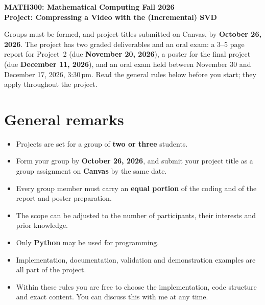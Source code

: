 \documentclass[11pt,a4paper]{article}
\begin{document}
\begin{center}
  {\large\bfseries MATH300: Mathematical Computing \textperiodcentered{} Fall 2026}\\[6pt]
  {\Large\bfseries Project: Compressing a Video with the (Incremental) SVD}
\end{center}
\vspace{6pt}

Groups must be formed, and project titles submitted on Canvas, by
\textbf{October 26, 2026}. The project
has two graded deliverables and an oral exam: a 3--5 page report for
Project~2 (due \textbf{November 20, 2026}), a poster for the final project
(due \textbf{December 11, 2026}), and an oral exam held between November 30
and December 17, 2026, 3:30\,pm. Read the general rules below before you
start; they apply throughout the project.

\section*{General remarks}
\begin{itemize}
  \item Projects are set for a group of \textbf{two or three} students.
  \item Form your group by \textbf{October 26, 2026}, and submit your
        project title as a group assignment on \textbf{Canvas} by the same
        date.
  \item Every group member must carry an \textbf{equal portion} of the coding
        and of the report and poster preparation.
  \item The scope can be adjusted to the number of participants, their
        interests and prior knowledge.
  \item Only \textbf{Python} may be used for programming.
  \item Implementation, documentation, validation and demonstration examples
        are all part of the project.
  \item Within these rules you are free to choose the implementation, code
        structure and exact content. You can discuss this with me at any time.
\end{itemize}
\end{document}
